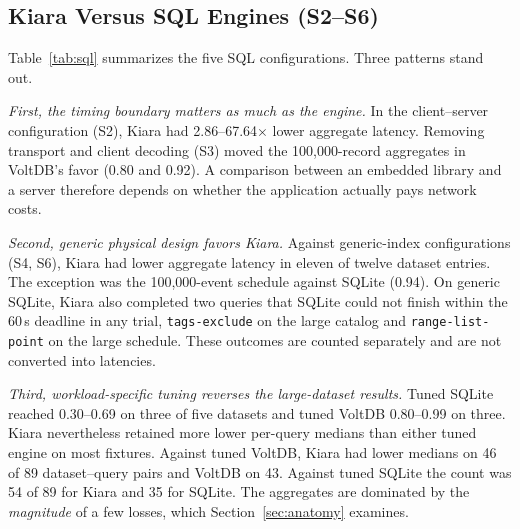 \subsection{Kiara Versus SQL Engines (S2--S6)}
Table~\ref{tab:sql} summarizes the five SQL configurations. Three patterns stand out.

\emph{First, the timing boundary matters as much as the engine.} In the client--server configuration (S2), Kiara had 2.86--67.64$\times$ lower aggregate latency. Removing transport and client decoding (S3) moved the 100,000-record aggregates in VoltDB's favor (0.80 and 0.92). A comparison between an embedded library and a server therefore depends on whether the application actually pays network costs.

\emph{Second, generic physical design favors Kiara.} Against generic-index configurations (S4, S6), Kiara had lower aggregate latency in eleven of twelve dataset entries. The exception was the 100,000-event schedule against SQLite (0.94). On generic SQLite, Kiara also completed two queries that SQLite could not finish within the 60\,s deadline in any trial, \texttt{tags-exclude} on the large catalog and \texttt{range-list-point} on the large schedule. These outcomes are counted separately and are not converted into latencies.

\emph{Third, workload-specific tuning reverses the large-dataset results.} Tuned SQLite reached 0.30--0.69 on three of five datasets and tuned VoltDB 0.80--0.99 on three. Kiara nevertheless retained more lower per-query medians than either tuned engine on most fixtures. Against tuned VoltDB, Kiara had lower medians on 46 of 89 dataset--query pairs and VoltDB on 43. Against tuned SQLite the count was 54 of 89 for Kiara and 35 for SQLite. The aggregates are dominated by the \emph{magnitude} of a few losses, which Section~\ref{sec:anatomy} examines.

